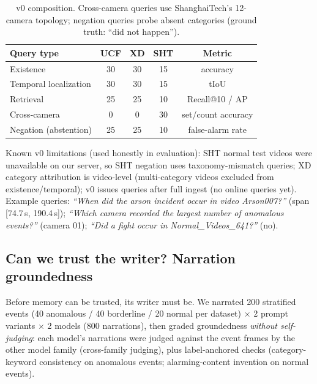 \begin{table}[h]
\centering
\caption{\smb v0 composition. Cross-camera queries use ShanghaiTech's 12-camera topology; negation queries probe absent categories (ground truth: ``did not happen'').}
\label{tab:smb}
\small
\begin{tabular}{@{}lcccc@{}}
\toprule
Query type & UCF & XD & SHT & Metric \\
\midrule
Existence & 30 & 30 & 15 & accuracy \\
Temporal localization & 30 & 30 & 15 & tIoU \\
Retrieval & 25 & 25 & 10 & Recall@10 / AP \\
Cross-camera & 0 & 0 & 30 & set/count accuracy \\
Negation (abstention) & 25 & 25 & 10 & false-alarm rate \\
\bottomrule
\end{tabular}
\end{table}

Known v0 limitations (used honestly in evaluation): SHT normal test videos were unavailable on our server, so SHT negation uses taxonomy-mismatch queries; XD category attribution is video-level (multi-category videos excluded from existence/temporal); v0 issues queries after full ingest (no online queries yet). Example queries: \emph{``When did the arson incident occur in video Arson007?''} (span [74.7\,s, 190.4\,s]); \emph{``Which camera recorded the largest number of anomalous events?''} (camera 01); \emph{``Did a fight occur in Normal\_Videos\_641?''} (no).

\subsection{Can we trust the writer? Narration groundedness}
\label{sec:exp-grounded}

Before memory can be trusted, its writer must be. We narrated 200 stratified events (40 anomalous / 40 borderline / 20 normal per dataset) $\times$ 2 prompt variants $\times$ 2 models (800 narrations), then graded groundedness \emph{without self-judging}: each model's narrations were judged against the event frames by the other model family (cross-family judging), plus label-anchored checks (category-keyword consistency on anomalous events; alarming-content invention on normal events).

